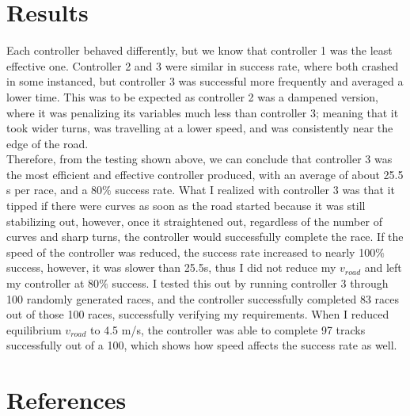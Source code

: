 \documentclass{article}
\begin{document}
\section{Results}
Each controller behaved differently, but we know that controller 1 was the least effective one. Controller 2 and 3 were similar in success rate, where both crashed in some instanced, but controller 3 was successful more frequently and averaged a lower time. This was to be expected as controller 2 was a dampened version, where it was penalizing its variables much less than controller 3; meaning that it took wider turns, was travelling at a lower speed, and was consistently near the edge of the road.\\
Therefore, from the testing shown above, we can conclude that controller 3 was the most efficient and effective controller produced, with an average of about 25.5 s per race, and a 80$\%$ success rate. What I realized with controller 3 was that it tipped if there were curves as soon as the road started because it was still stabilizing out, however, once it straightened out, regardless of the number of curves and sharp turns, the controller would successfully complete the race. If the speed of the controller was reduced, the success rate increased to nearly 100$\%$ success, however, it was slower than 25.5s, thus I did not reduce my $v_{road}$ and left my controller at 80$\%$ success. I tested this out by running controller 3 through 100 randomly generated races, and the controller successfully completed 83 races out of those 100 races, successfully verifying my requirements. When I reduced equilibrium $v_{road}$ to 4.5 m/s, the controller was able to complete 97 tracks successfully out of a 100, which shows how speed affects the success rate as well.

\section{References}


\end{document}
